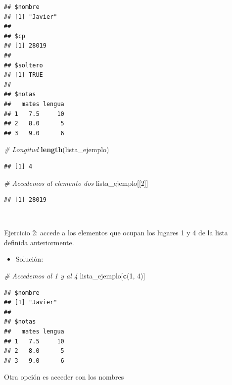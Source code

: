 \documentclass[11pt,]{book}
\newenvironment{Shaded}{\begin{snugshade}}{\end{snugshade}}
\newcommand{\CommentTok}[1]{\textcolor[rgb]{0.37,0.37,0.37}{\textit{#1}}}
\newcommand{\DecValTok}[1]{\textcolor[rgb]{0.06,0.06,0.06}{#1}}
\newcommand{\KeywordTok}[1]{\textcolor[rgb]{0.27,0.27,0.27}{\textbf{#1}}}
\newcommand{\NormalTok}[1]{#1}
\newcommand{\OperatorTok}[1]{\textcolor[rgb]{0.43,0.43,0.43}{\textbf{#1}}}
\providecommand{\tightlist}{%
  \setlength{\itemsep}{0pt}\setlength{\parskip}{0pt}}
\begin{document}
\begin{verbatim}
## $nombre
## [1] "Javier"
## 
## $cp
## [1] 28019
## 
## $soltero
## [1] TRUE
## 
## $notas
##   mates lengua
## 1   7.5     10
## 2   8.0      5
## 3   9.0      6
\end{verbatim}

\begin{Shaded}
\begin{Highlighting}[]
\CommentTok{# Longitud}
\KeywordTok{length}\NormalTok{(lista_ejemplo)}
\end{Highlighting}
\end{Shaded}

\begin{verbatim}
## [1] 4
\end{verbatim}

\begin{Shaded}
\begin{Highlighting}[]
\CommentTok{# Accedemos al elemento dos}
\NormalTok{lista_ejemplo[[}\DecValTok{2}\NormalTok{]]}
\end{Highlighting}
\end{Shaded}

\begin{verbatim}
## [1] 28019
\end{verbatim}

~

Ejercicio 2: accede a los elementos que ocupan los lugares 1 y 4 de la lista definida anteriormente.

\begin{itemize}
\tightlist
\item
  Solución:
\end{itemize}

\begin{Shaded}
\begin{Highlighting}[]
\CommentTok{# Accedemos al 1 y al 4}
\NormalTok{lista_ejemplo[}\KeywordTok{c}\NormalTok{(}\DecValTok{1}\NormalTok{, }\DecValTok{4}\NormalTok{)]}
\end{Highlighting}
\end{Shaded}

\begin{verbatim}
## $nombre
## [1] "Javier"
## 
## $notas
##   mates lengua
## 1   7.5     10
## 2   8.0      5
## 3   9.0      6
\end{verbatim}

Otra opción es acceder con los nombres

\begin{Shaded}
\end{Shaded}
\end{document}
